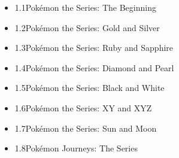 \documentclass[a4paper,12pt]{article}
\begin{document}
\begin{itemize}
\item 1.1Pokémon the Series: The Beginning
\item 1.2Pokémon the Series: Gold and Silver
\item 1.3Pokémon the Series: Ruby and Sapphire
\item 1.4Pokémon the Series: Diamond and Pearl
\item 1.5Pokémon the Series: Black and White
\item 1.6Pokémon the Series: XY and XYZ
\item 1.7Pokémon the Series: Sun and Moon
\item 1.8Pokémon Journeys: The Series
\end{itemize}\\ \par \vspace{0.5cm}
\end{document}

